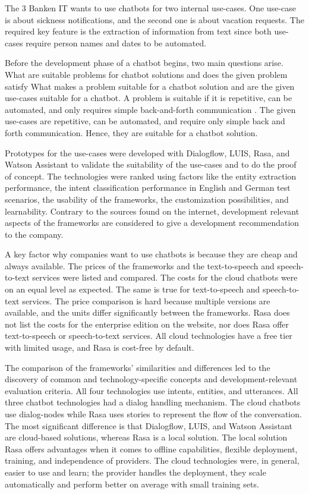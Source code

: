 The 3 Banken IT wants to use chatbots for two internal use-cases.
One use-case is about sickness notifications, and the second one is about vacation requests.
The required key feature is the extraction of information from text since both use-cases require person names and dates to be automated.

Before the development phase of a chatbot begins, two main questions arise. 
What are suitable problems for chatbot solutions and does the given problem satisfy 
What makes a problem suitable for a chatbot solution and are the given use-cases suitable for a chatbot.
A problem is suitable if it is repetitive, can 
be automated, and 
only requires simple back-and-forth communication \cite{buiildChatbotsPython}.
The given use-cases are repetitive, can be automated, and require only simple back and forth communication.
Hence, they are suitable for a chatbot solution.

Prototypes for the use-cases were developed with Dialogflow, LUIS, Rasa, and Watson Assistant to validate the suitability of the use-cases and to do the proof of concept.
The technologies were ranked using factors like the entity extraction performance, the intent classification performance in English and German test scenarios, the usability of the frameworks, the customization possibilities, and learnability.
Contrary to the sources found on the internet, development relevant aspects of the frameworks are considered to give a development recommendation to the company. 

A key factor why companies want to use chatbots is because they are cheap and always available. The prices of the frameworks and the text-to-speech and speech-to-text services were listed and compared.
The costs for the cloud chatbots were on an equal level as expected.
The same is true for text-to-speech and speech-to-text services.
The price comparison is hard because multiple versions are available, and the units differ significantly between the frameworks. 
Rasa does not list the costs for the enterprise edition on the website, nor does Rasa offer text-to-speech or speech-to-text services.
All cloud technologies have a free tier with limited usage, and Rasa is cost-free by default.

The comparison of the frameworks' similarities and differences led to the discovery of common and technology-specific concepts and development-relevant evaluation criteria.
All four technologies use intents, entities, and utterances.
All three chatbot technologies had a dialog handling mechanism.
The cloud chatbots use dialog-nodes while Rasa uses stories to represent 
the flow of the conversation.
The most significant difference is that Dialogflow, LUIS, and Watson Assistant are cloud-based solutions, whereas Rasa is a local solution.
The local solution Rasa offers advantages when it comes to offline capabilities, flexible deployment, training, and independence of providers.
The cloud technologies were, in general, easier to use and learn; the provider handles the deployment, they scale automatically and perform better on average with small training sets. 

